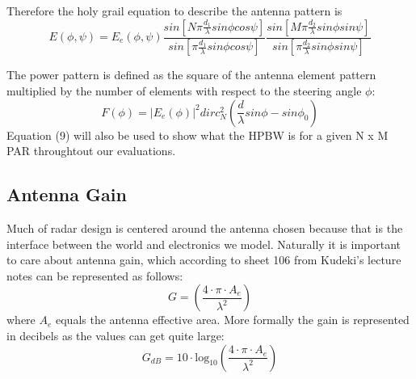 \documentclass[conference]{IEEEtran}
\begin{document}
Therefore the holy grail equation to describe the antenna pattern is 
\begin{equation}
    E(\phi,\psi) = E_e(\phi,\psi)\frac{sin[N\pi\frac{d_1}{\lambda}sin\phi cos\psi]}{sin[\pi\frac{d_1}{\lambda}sin\phi cos\psi]}\frac{sin[M\pi\frac{d_2}{\lambda}sin\phi sin\psi]}{sin[\pi\frac{d_2}{\lambda}sin\phi sin\psi]}
\end{equation}
\par The power pattern is defined as the square of the antenna element pattern multiplied by the number of elements with respect to the steering angle $\phi$:
\begin{equation}
    F(\phi) = |E_e(\phi)|^2dirc_N^2(\frac{d}{\lambda}sin\phi - sin\phi_0)
\end{equation}
Equation (9) will also be used to show what the HPBW is for a given N x M PAR throughtout our evaluations. 
\subsection{Antenna Gain}
\par Much of radar design is centered around the antenna chosen because that is the interface between the world and electronics we model. Naturally it is important to care about antenna gain, which according to sheet 106 from Kudeki's lecture notes \cite{kudeki} can be represented as follows:
\begin{equation}
    G = (\frac{4\cdot\pi\cdot A_e}{\lambda^2})
\end{equation}
where \emph{$A_e$} equals the antenna effective area. More formally the gain is represented in decibels as the values can get quite large:
\begin{equation}
    G_{dB} = 10\cdot \text{log}_{10}(\frac{4\cdot\pi\cdot A_e}{\lambda^2})
\end{equation}

\end{document}
